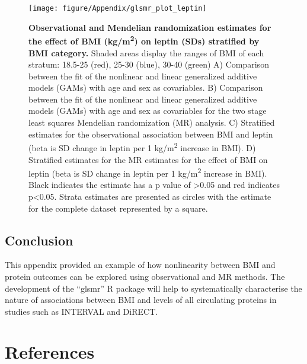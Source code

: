 \documentclass[11pt,twoside]{bristolthesis}
\begin{document}
\begin{figure}

{\centering \texttt{[image: figure/Appendix/glsmr\_plot\_leptin]} 

}

\caption[Observational and Mendelian randomization estimates for the effect of BMI on leptin stratified by BMI category.]{\textbf{Observational and Mendelian randomization estimates for the effect of BMI (kg/m\textsuperscript{2}) on leptin (SDs) stratified by BMI category.} Shaded areas display the ranges of BMI of each stratum: 18.5-25 (red), 25-30 (blue), 30-40 (green) A) Comparison between the fit of the nonlinear and linear generalized additive models (GAMs) with age and sex as covariables. B) Comparison between the fit of the nonlinear and linear generalized additive models (GAMs) with age and sex as covariables for the two stage least squares Mendelian randomization (MR) analysis. C) Stratified estimates for the observational association between BMI and leptin (beta is SD change in leptin per 1 kg/m\textsuperscript{2} increase in BMI). D) Stratified estimates for the MR estimates for the effect of BMI on leptin (beta is SD change in leptin per 1 kg/m\textsuperscript{2} increase in BMI). Black indicates the estimate has a p value of \textgreater0.05 and red indicates p\textless0.05. Strata estimates are presented as circles with the estimate for the complete dataset represented by a square.}\label{fig:leptin-glsmr}
\end{figure}
\hypertarget{conclusion}{%
\section{Conclusion}\label{conclusion}}

This appendix provided an example of how nonlinearity between BMI and protein outcomes can be explored using observational and MR methods. The development of the ``glsmr'' R package will help to systematically characterise the nature of associations between BMI and levels of all circulating proteins in studies such as INTERVAL and DiRECT.

\backmatter

\hypertarget{references}{%
\chapter*{References}\label{references}}

\end{document}
